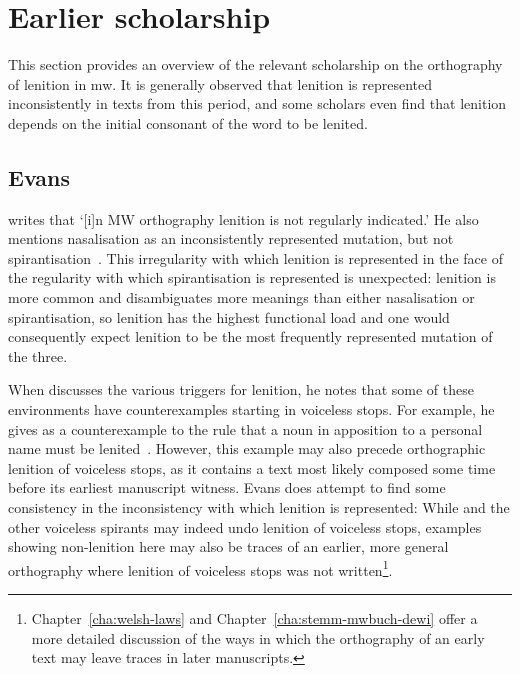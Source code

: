 \section{Earlier scholarship}
\label{sec:earlier-literature}
This section provides an overview of the relevant scholarship on the orthography of lenition in \gls{mw}. It is generally observed that lenition is represented inconsistently in texts from this period, and some scholars even find that lenition depends on the initial consonant of the word to be lenited.

\subsection{Evans}
\label{sec:evans}

\Textcite[§~18]{evans_grammar_1964} writes that `[i]n MW orthography lenition is not regularly indicated.' He also mentions nasalisation as an inconsistently represented mutation, but not spirantisation~\autocite[§§~24--25]{evans_grammar_1964}. This irregularity with which lenition is represented in the face of the regularity with which spirantisation is represented is unexpected:  lenition is  more common and  disambiguates more meanings than either nasalisation or spirantisation, so lenition has the highest functional load and one would consequently expect lenition to be the most frequently represented mutation of the three.

When \textcite{evans_grammar_1964} discusses the various triggers for lenition, he notes that some of these environments have counterexamples starting in voiceless stops. For example, he gives   as a counterexample to the rule that a noun in apposition to a personal name must be lenited~\autocite[§~19]{evans_grammar_1964}. However, this example may also precede orthographic lenition of voiceless stops, as it contains a text most likely composed some time before its earliest manuscript witness. Evans does attempt to find some consistency in the inconsistency with which lenition is represented:
While  and the other voiceless spirants may indeed undo lenition of voiceless stops, examples showing non-lenition here may also be traces of an earlier, more general orthography where lenition of voiceless stops was not written\footnote{Chapter~\ref{cha:welsh-laws} and Chapter~\ref{cha:stemm-mwbuch-dewi} offer a more detailed discussion of the ways in which the orthography of an early text may leave traces in later manuscripts.}.

